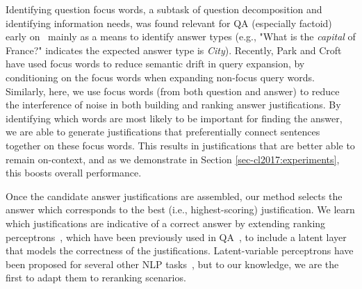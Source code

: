 Identifying question focus words, a subtask of question decomposition and identifying information needs, was found relevant for QA (especially factoid) early on~\cite[inter alia]{Harabagiu:00,Moldovan:2003:PIE:763693.763694} mainly as a means to identify answer types (e.g., "What is the {\em capital} of France?" indicates the expected answer type is \emph{City}).  
Recently, Park and Croft~\citeyear{Park:2015} have used focus words to reduce semantic drift in query expansion, by conditioning on the focus words when expanding non-focus query words.
Similarly, here, we use focus words (from both question and answer) to reduce the interference of noise in both building and ranking answer justifications.  By identifying which words are most likely to be important for finding the answer, we are able to generate justifications that preferentially connect sentences together on these focus words.  This results in justifications that are better able to remain on-context, and as we demonstrate in Section \ref{sec-cl2017:experiments}, this boosts overall performance. 

Once the candidate answer justifications are assembled, our method selects the answer which corresponds to the best (i.e., highest-scoring) justification.  We learn which justifications are indicative of a correct answer by extending ranking perceptrons~\cite{Shen:Joshi:2005}, which have been previously used in QA~\cite{Surdeanu:11}, to include a latent layer that models the correctness of the justifications. Latent-variable perceptrons have been proposed for several other NLP tasks~\cite{liang2006end,zettlemoyer2007online,sun2009latent,hoffmann2011knowledge,fernandes2012latent,bjorkelund2014learning}, but to our knowledge, we are the first to adapt them to reranking scenarios. 

